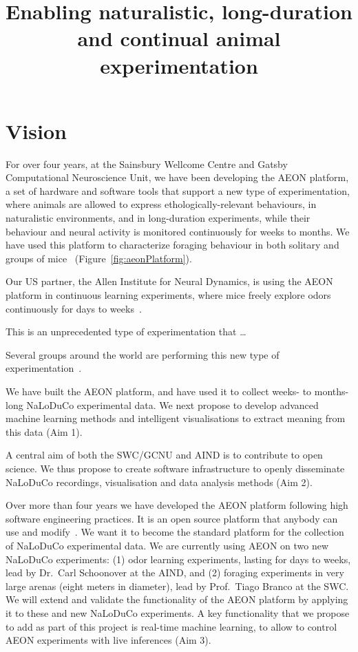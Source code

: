 \documentclass[12pt]{article}
\title{Enabling naturalistic, long-duration and continual animal experimentation}
\begin{document}
\maketitle

\tableofcontents
\pagebreak

\section{Vision}

For over four years, at the Sainsbury Wellcome Centre and Gatsby Computational
Neuroscience Unit, we have been developing the AEON platform, a set of hardware
and software tools that support a new type of experimentation, where animals
are allowed to express ethologically-relevant behaviours, in naturalistic
environments, and in long-duration experiments, while their behaviour and
neural activity is monitored continuously for weeks to months.
%
We have used this platform to characterize foraging behaviour in both solitary
and groups of mice~\citep{aeonRepo} (Figure~\ref{fig:aeonPlatform}).

Our US partner, the Allen Institute for Neural Dynamics, is using the AEON
platform in continuous learning experiments, where mice freely explore odors
continuously for days to weeks~\citep{carlsPapers}.

This is an unprecedented type of experimentation that \ldots

Several groups around the world are performing this new type of
experimentation~\cite{}.

We have built the AEON platform, and have used it to collect weeks- to
months-long NaLoDuCo experimental data. We next propose to develop advanced
machine learning methods and intelligent visualisations to extract meaning from
this data (Aim 1).

A central aim of both the SWC/GCNU and AIND is to contribute to open science.
We thus propose to create software infrastructure to openly disseminate
NaLoDuCo recordings, visualisation and data analysis methods (Aim 2).

Over more than four years we have developed the AEON platform following high
software engineering practices. It is an open source platform that anybody can
use and modify~\citep{aeonResources}. We want it to become the standard platform for the collection
of NaLoDuCo experimental data.
%
We are currently using AEON on two new NaLoDuCo experiments: (1) odor learning
experiments, lasting for days to weeks, lead by Dr.~Carl Schoonover at the
AIND, and (2) foraging experiments in very large arenas (eight meters in
diameter), lead by Prof.~Tiago Branco at the SWC.
%
We will extend and validate the functionality of the AEON platform by applying
it to these and new NaLoDuCo experiments.
%
A key functionality that we propose to add as part of this project is real-time
machine learning, to allow to control AEON experiments with live inferences
(Aim 3).
\end{document}

